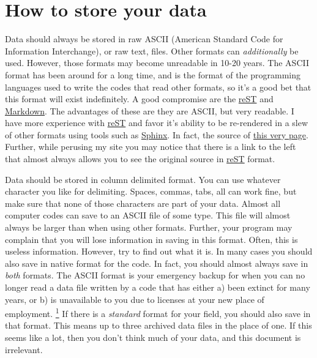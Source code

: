 \documentclass[a4paper]{article}
\providecommand*{\DUfootnotemark}[3]{%
  \raisebox{1em}{\hypertarget{#1}{}}%
  \hyperlink{#2}{\textsuperscript{#3}}%
}
\begin{document}
\section{How to store your data%
  \label{how-to-store-your-data}%
}

Data should always be stored in raw ASCII (American Standard Code for
Information Interchange), or raw text, files. Other formats can
\emph{additionally} be used. However, those formats may become unreadable in
10-20 years. The ASCII format has been around for a long time, and is
the format of the programming languages used to write the codes that
read other formats, so it's a good bet that this format will exist
indefinitely. A good compromise are the \href{http://docutils.sourceforge.net/rst.html}{reST} and \href{http://daringfireball.net/projects/markdown/}{Markdown}. The advantages of
these are they are ASCII, but very readable. I have more experience
with \href{http://docutils.sourceforge.net/rst.html}{reST} and favor it's ability to
be re-rendered in a slew of other formats using tools such as \href{http://sphinx-doc.org}{Sphinx}. In fact, the source of \href{http://cecs.wright.edu/~jslater/_sources/archivingdata/archivingdata.txt}{this very page}. Further,
while perusing my site you may notice that there is a link to the
left that almost always allows you to see the original source in \href{http://docutils.sourceforge.net/rst.html}{reST}
format.

Data should be stored in column delimited format. You can use whatever
character you like for delimiting. Spaces, commas, tabs, all can work
fine, but make sure that none of those characters are part of your data.
Almost all computer codes can save to an ASCII file of some type. This
file will almost always be larger than when using other formats.
Further, your program may complain that you will lose information in
saving in this format. Often, this is useless information. However, try
to find out what it is. In many cases you should also save in native
format for the code. In fact, you should almost always save in \emph{both}
formats. The ASCII format is your emergency backup for when you can no
longer read a data file written by a code that has either a) been
extinct for many years, or b) is unavailable to you due to licenses at
your new place of employment.\DUfootnotemark{id3}{id18}{1} If there is a \emph{standard} format for
your field, you should also save in that format. This means up to three
archived data files in the place of one. If this seems like a lot, then
you don't think much of your data, and this document is irrelevant.
\end{document}
